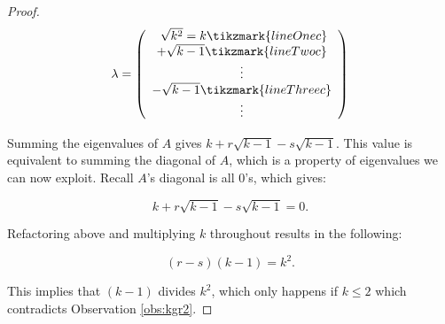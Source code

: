 \documentclass{article}
\begin{document}
\begin{proof}
\[ \lambda = 
    \left (
        \begin{array}{c}
            \
            \sqrt{k^2} = k \tikzmark{lineOnec} \\
            + \sqrt{k - 1} \tikzmark{lineTwoc}\\
            \vdots \\
            - \sqrt{k - 1} \tikzmark{lineThreec}\\
            \vdots \\
        \end{array}
    \right )
\]


Summing the eigenvalues of $A$ gives $k + r\sqrt{k - 1} - s\sqrt{k -1}$. This value is equivalent to summing the diagonal of $A$, which is a property of eigenvalues we can now exploit. Recall $A$'s diagonal is all 0's, which gives:

\[ 
k + r\sqrt{k - 1} - s\sqrt{k -1} = 0\text{.}
\]

Refactoring above and multiplying $k$ throughout results in the following:

\[
(r - s)(k - 1) = k^2\text{.}
\]

This implies that $(k - 1)$ divides $k^2$, which only happens if $k \leq 2$ which contradicts Observation \ref{obs:kgr2}.
\end{proof}
\end{document}
